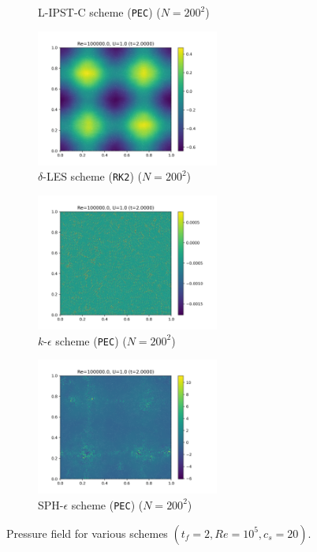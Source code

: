 \begin{figure}[htbp!]
\begin{subfigure}{7cm}
  \caption{L-IPST-C scheme (\texttt{PEC}) ($N=200^2$)}
  \end{subfigure}
  \begin{subfigure}{7cm}
  \centering\includegraphics[width=6cm]{Code-Figures/long-tgv/c0_20_tait_hdx_2_rk2_dtmul_1.5_n_o_files_50_nx_200_pst_10_re_100000_deltales_tf_2/final_p.png}
  \caption{$\delta$-LES scheme (\texttt{RK2}) ($N=200^2$)}
  \end{subfigure}
  \begin{subfigure}{7cm}
  \centering\includegraphics[width=6cm]{Code-Figures/long-tgv/c0_20_tait_hdx_2_pec_dtmul_1_no_n_o_files_50_nx_200_pst_10_re_100000_k_eps_tf_2/final_p.png}
  \caption{$k$-$\epsilon$ scheme (\texttt{PEC}) ($N=200^2$)}
  \end{subfigure}
  \begin{subfigure}{7cm}
  \centering\includegraphics[width=6cm]{Code-Figures/long-tgv/c0_20_tait_hdx_2_pec_dtmul_1_mon2017_eps_0.5_no_n_o_files_50_nx_200_pst_10_re_100000_mon2017_tf_2/final_p.png}
  \caption{SPH-$\epsilon$ scheme (\texttt{PEC}) ($N=200^2$)}
  \end{subfigure}
  \caption{Pressure field for various schemes $(t_f=2, Re=10^5, c_s=20)$.}
  \label{fig:ltgv-scheme-pressure}
\end{figure}

